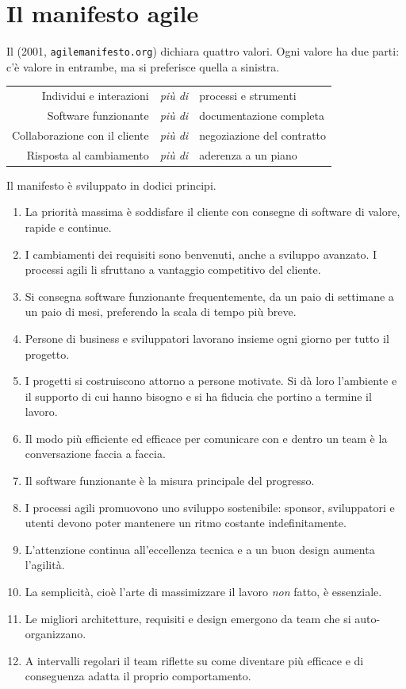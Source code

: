 \section{Il manifesto agile}
\label{sec:agile-manifesto}

Il  (2001, \texttt{agilemanifesto.org}) dichiara quattro valori.
Ogni valore ha due parti: c'è valore in entrambe, ma si preferisce quella a sinistra.

\begin{center}
\begin{tabular}{@{}rcl@{}}
Individui e interazioni & \emph{più di} & processi e strumenti \\
Software funzionante & \emph{più di} & documentazione completa \\
Collaborazione con il cliente & \emph{più di} & negoziazione del contratto \\
Risposta al cambiamento & \emph{più di} & aderenza a un piano \\
\end{tabular}
\end{center}

Il manifesto è sviluppato in dodici principi.

\begin{enumerate}
  \item La priorità massima è soddisfare il cliente con consegne di software di valore, rapide e continue.
  \item I cambiamenti dei requisiti sono benvenuti, anche a sviluppo avanzato. I processi agili li sfruttano a
    vantaggio competitivo del cliente.
  \item Si consegna software funzionante frequentemente, da un paio di settimane a un paio di mesi, preferendo
    la scala di tempo più breve.
  \item Persone di business e sviluppatori lavorano insieme ogni giorno per tutto il progetto.
  \item I progetti si costruiscono attorno a persone motivate. Si dà loro l'ambiente e il supporto di cui hanno bisogno
    e si ha fiducia che portino a termine il lavoro.
  \item Il modo più efficiente ed efficace per comunicare con e dentro un team è la conversazione faccia a faccia.
  \item Il software funzionante è la misura principale del progresso.
  \item I processi agili promuovono uno sviluppo sostenibile: sponsor, sviluppatori e utenti devono poter mantenere
    un ritmo costante indefinitamente.
  \item L'attenzione continua all'eccellenza tecnica e a un buon design aumenta l'agilità.
  \item La semplicità, cioè l'arte di massimizzare il lavoro \emph{non} fatto, è essenziale.
  \item Le migliori architetture, requisiti e design emergono da team che si auto-organizzano.
  \item A intervalli regolari il team riflette su come diventare più efficace e di conseguenza adatta il proprio
    comportamento.
\end{enumerate}

